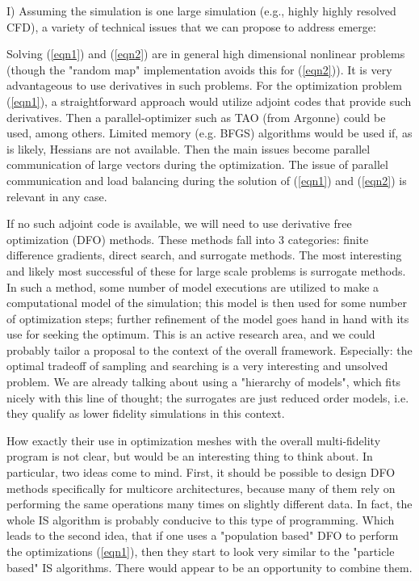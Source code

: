 \documentclass[11pt]{article}
\begin{document}
I) Assuming the simulation is one large simulation (e.g., highly highly resolved CFD), 
a variety of technical issues that we can propose to address emerge:

Solving (\ref{eqn1}) and (\ref{eqn2}) are in general high dimensional nonlinear problems (though the "random map" implementation
avoids this for (\ref{eqn2})). 
 It is very advantageous to use derivatives in such problems.
For the optimization problem (\ref{eqn1}), a straightforward approach would utilize adjoint codes that provide such derivatives.  Then a
parallel-optimizer such as TAO (from Argonne) could be used, among others.  Limited memory (e.g. BFGS) algorithms would be used if, as 
is likely, Hessians are not available.  Then the main issues become parallel communication of large vectors
during the optimization.  The issue of parallel communication and load balancing during the solution of (\ref{eqn1}) and (\ref{eqn2}) is
relevant in any case.

If no such adjoint code is available, we will need to use derivative free optimization (DFO) methods.  These methods fall into 3 categories: finite
difference gradients, direct search, and surrogate methods.  The most interesting and likely most successful of these for large scale problems is
surrogate methods.  In such a method, some number of model executions are utilized to make a computational model of the simulation; this model is then 
used for some number of optimization steps;  further refinement of the model goes hand in hand with its use for seeking the optimum.  This is
an active research area, and we could probably tailor a proposal to the context of the overall framework.  Especially: the optimal tradeoff 
of sampling and searching is a very interesting and unsolved problem.  We are already talking about using a "hierarchy of models", which fits nicely
with this line of thought; the surrogates are just reduced order models, i.e. they qualify as lower fidelity simulations in this context.  

How exactly
their use in optimization meshes with the overall multi-fidelity program is not clear, but would be an interesting thing to think about.
In particular, two ideas come to mind.  First, it should be possible to design DFO methods specifically for multicore architectures, 
because many of them rely on performing the same operations many times on slightly different data.  In fact, the whole IS algorithm is probably 
conducive to this type of programming.  Which leads to the second idea, that if one uses a "population based" DFO to perform the
optimizations (\ref{eqn1}), then they start to look very similar to the "particle based" IS algorithms.  There would appear to be an opportunity to combine them.
\end{document}
